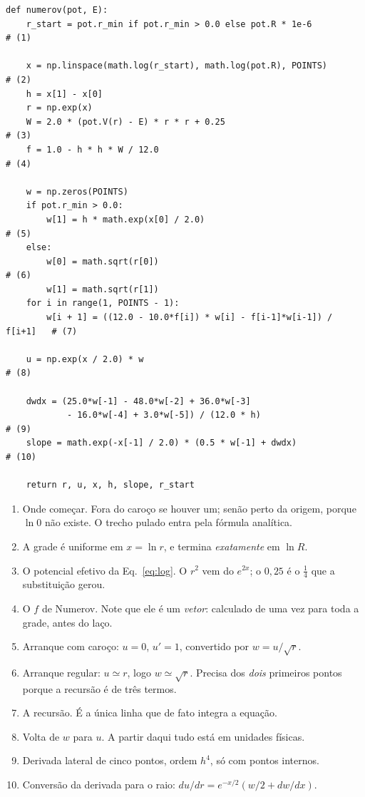 \documentclass[11pt,a4paper]{article}
\begin{document}
\begin{lstlisting}
def numerov(pot, E):
    r_start = pot.r_min if pot.r_min > 0.0 else pot.R * 1e-6          # (1)

    x = np.linspace(math.log(r_start), math.log(pot.R), POINTS)       # (2)
    h = x[1] - x[0]
    r = np.exp(x)
    W = 2.0 * (pot.V(r) - E) * r * r + 0.25                           # (3)
    f = 1.0 - h * h * W / 12.0                                        # (4)

    w = np.zeros(POINTS)
    if pot.r_min > 0.0:
        w[1] = h * math.exp(x[0] / 2.0)                               # (5)
    else:
        w[0] = math.sqrt(r[0])                                        # (6)
        w[1] = math.sqrt(r[1])
    for i in range(1, POINTS - 1):
        w[i + 1] = ((12.0 - 10.0*f[i]) * w[i] - f[i-1]*w[i-1]) / f[i+1]   # (7)

    u = np.exp(x / 2.0) * w                                           # (8)

    dwdx = (25.0*w[-1] - 48.0*w[-2] + 36.0*w[-3]
            - 16.0*w[-4] + 3.0*w[-5]) / (12.0 * h)                    # (9)
    slope = math.exp(-x[-1] / 2.0) * (0.5 * w[-1] + dwdx)             # (10)

    return r, u, x, h, slope, r_start
\end{lstlisting}

\begin{enumerate}\setlength\itemsep{1pt}
\item Onde começar. Fora do caroço se houver um; senão perto da origem, porque
      $\ln 0$ não existe. O trecho pulado entra pela fórmula analítica.
\item A grade é uniforme em $x=\ln r$, e termina \emph{exatamente} em $\ln R$.
\item O potencial efetivo da Eq.~\eqref{eq:log}. O $r^2$ vem do $e^{2x}$; o
      $0{,}25$ é o $\tfrac14$ que a substituição gerou.
\item O $f$ de Numerov. Note que ele é um \emph{vetor}: calculado de uma vez
      para toda a grade, antes do laço.
\item Arranque com caroço: $u=0$, $u'=1$, convertido por $w=u/\sqrt{r}$.
\item Arranque regular: $u\simeq r$, logo $w\simeq\sqrt{r}$. Precisa dos
      \emph{dois} primeiros pontos porque a recursão é de três termos.
\item A recursão. É a única linha que de fato integra a equação.
\item Volta de $w$ para $u$. A partir daqui tudo está em unidades físicas.
\item Derivada lateral de cinco pontos, ordem $h^4$, só com pontos internos.
\item Conversão da derivada para o raio: $du/dr = e^{-x/2}(w/2 + dw/dx)$.
\end{enumerate}
\end{document}
